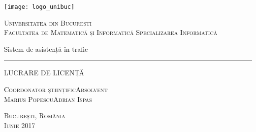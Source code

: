 \begin{titlepage}
	\begin{center}

		\texttt{[image: logo\_unibuc]}

		\vspace{0.5cm}
		\LARGE \textsc{Universitatea din București}
		\\
		\vspace{0.5cm}
		\Large \textsc{Facultatea de Matematică și Informatică}
		\vspace{0.5cm}
		\Large \textsc{Specializarea Informatică}

		\vfill

		\Huge Sistem de asistență în trafic
		\rule{\textwidth}{1pt}
		\Large LUCRARE DE LICENȚĂ

		\vfill

		\Large
		\textsc{Coordonator științific}\hfill \textsc{Absolvent}
		\\
		\large
		\textsc{Marius Popescu}\hfill \textsc{Adrian Ispas}
	
		\vspace{1.5cm}
		\textsc{București, România}\\
		\textsc{Iunie 2017}

	\end{center}
\end{titlepage}
 
